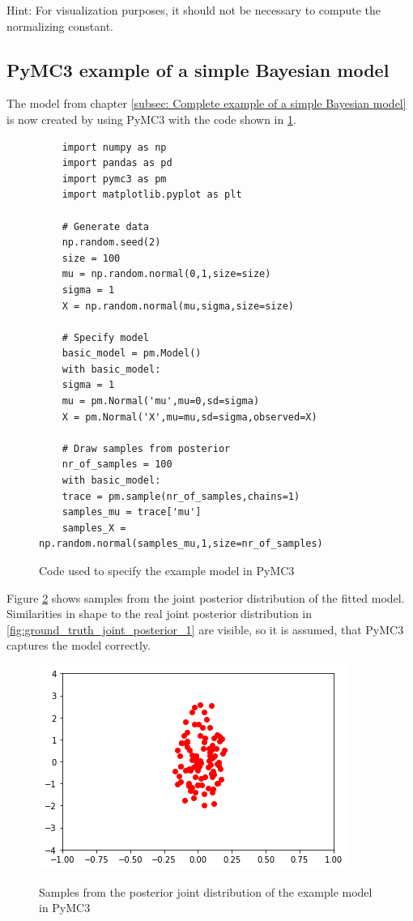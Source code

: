 \documentclass{article}
\begin{document}
Hint: For visualization purposes, it should not be necessary to compute the normalizing constant.

\subsection{PyMC3 example of a simple Bayesian model}
\label{subsec: PyMC3 example of a simple Bayesian model}
The model from chapter \autoref{subsec: Complete example of a simple Bayesian model} is now created by using PyMC3 with the code shown in \ref{fig:PyMC3_example_code_simple_model}.
\begin{figure}[h]
	\begin{lstlisting}
	import numpy as np
	import pandas as pd
	import pymc3 as pm
	import matplotlib.pyplot as plt
	
	# Generate data
	np.random.seed(2)
	size = 100
	mu = np.random.normal(0,1,size=size)
	sigma = 1
	X = np.random.normal(mu,sigma,size=size)

	# Specify model
	basic_model = pm.Model()
	with basic_model:
	sigma = 1
	mu = pm.Normal('mu',mu=0,sd=sigma)
	X = pm.Normal('X',mu=mu,sd=sigma,observed=X)

	# Draw samples from posterior
	nr_of_samples = 100
	with basic_model:
	trace = pm.sample(nr_of_samples,chains=1)
	samples_mu = trace['mu']
	samples_X = np.random.normal(samples_mu,1,size=nr_of_samples)
	\end{lstlisting}
	\label{fig:PyMC3_example_code_simple_model}
	\caption[Code used to specify the example model in PyMC3]{Code used to specify the example model in PyMC3}
\end{figure}
Figure \ref{fig:PyMC3_joint_posterior_samples_simple_model} shows samples from the joint posterior distribution of the fitted model. Similarities in shape to the real joint posterior distribution in \ref{fig:ground_truth_joint_posterior_1} are visible, so it is assumed, that PyMC3 captures the model correctly.
\begin{figure}
	\includegraphics[width=\textwidth]{images/PyMC3_joint_posterior_samples_simple_model.png}
	\label{fig:PyMC3_joint_posterior_samples_simple_model}
	\caption[Samples from the posterior joint distribution of the example model in PyMC3]{Samples from the posterior joint distribution of the example model in PyMC3}
\end{figure}
\end{document}
